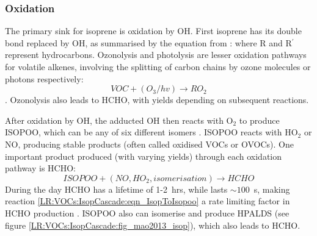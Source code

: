     \subsubsection{Oxidation}
      
      The primary sink for isoprene is oxidation by OH.
      First isoprene has its double bond replaced by OH, as summarised by the equation from \textcite{Patchen2007}:
      where R and R$^{\prime}$ represent hydrocarbons.
      Ozonolysis and photolysis are lesser oxidation pathways for volatile alkenes, involving the splitting of carbon chains by ozone molecules or photons respectively:
      \begin{equation*}
        VOC + (O_3/hv) \rightarrow RO_2
      \end{equation*}
      \parencite{Nguyen2016,Wolfe2016}.
      Ozonolysis also leads to HCHO, with yields depending on subsequent reactions.
      
      After oxidation by OH, the adducted OH then reacts with O$_2$ to produce ISOPOO, which can be any of six different isomers \parencite{Patchen2007}.
      ISOPOO reacts with HO$_2$ or NO, producing stable products (often called oxidised VOCs or OVOCs).
      One important product produced (with varying yields) through each oxidation pathway is HCHO: 
      \begin{equation*}
        ISOPOO + (NO, HO_2, isomerisation) \rightarrow HCHO 
      \end{equation*}
      During the day HCHO has a lifetime of 1-2~hrs, while \roo lasts $\sim 100$~s, making reaction \ref{LR:VOCs:IsopCascade:eqn_IsopToIsopoo} a rate limiting factor in HCHO production \parencite{Wolfe2016}.
      ISOPOO also can isomerise and produce HPALDS (see figure \ref{LR:VOCs:IsopCascade:fig_mao2013_isop}), which also leads to HCHO.
      
      
      
      
